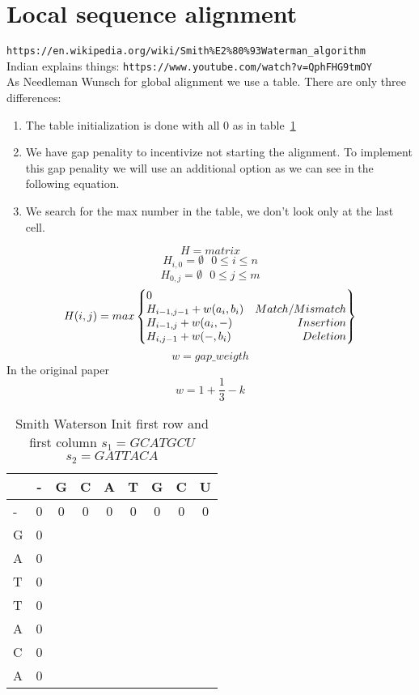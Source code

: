 \documentclass[11pt]{article}
\begin{document}
\section{Local sequence alignment} %
\label{sec:local_sequence_alignment}
\texttt{https://en.wikipedia.org/wiki/Smith\%E2\%80\%93Waterman\_algorithm}\\
Indian explains things: \texttt{https://www.youtube.com/watch?v=QphFHG9tmOY}\\
As Needleman Wunsch for global alignment we use a table. There are only three differences:
\begin{enumerate}
	\item The table initialization is done with all 0 as in table~\ref{tab:SW_init}
	\item We have gap penality to incentivize not starting the alignment. To implement this gap penality we will use an additional option as we can see in the following equation.
	\item We search for the max number in the table, we don't look only at the last cell.
\end{enumerate}
\newpage

\[ H = matrix \]
\[ H_{i,0} = \emptyset \ \ \ 0 \leq i \leq n \]
\[ H_{0,j} = \emptyset \ \ \ 0 \leq j \leq m  \]
\[
	H(i,j) = max \left\{\begin{array}{@{}lr@{}}
		0   	& \\
		H_{i-1,j-1} + w(a_i, b_i) & Match/Mismatch \\
		H_{i-1,j} + w(a_i, -) & Insertion \\
		H_{i,j-1} + w(-, b_i) & Deletion \\
	\end{array}\right\}
\]
\[ w = gap\_weigth\]
In the original paper
\[
	w = 1 + \frac{1}{3} - k 
\]
\begin{table}[ht]
	\caption{Smith Waterson Init first row and first column $s_1 = GCATGCU$ $s_2 = GATTACA$}
	\label{tab:SW_init}
	\centering

	\begin{tabular}{l|c ccccccc}
	\hline

	\hline
		  & - & G & C & A & T & G & C & U \\
	\hline
	 	- & 0  & 0 & 0 & 0 & 0 & 0 & 0 & 0 \\
	 	G & 0  &   &   &   &   &   &   &   \\
	 	A & 0  &   &   &   &   &   &   &   \\
	 	T & 0  &   &   &   &   &   &   &   \\
	 	T & 0  &   &   &   &   &   &   &   \\
	 	A & 0  &   &   &   &   &   &   &   \\
	 	C & 0  &   &   &   &   &   &   &   \\
	 	A & 0  &   &   &   &   &   &   &   \\
	\hline
	\end{tabular}
\end{table}
\end{document}
